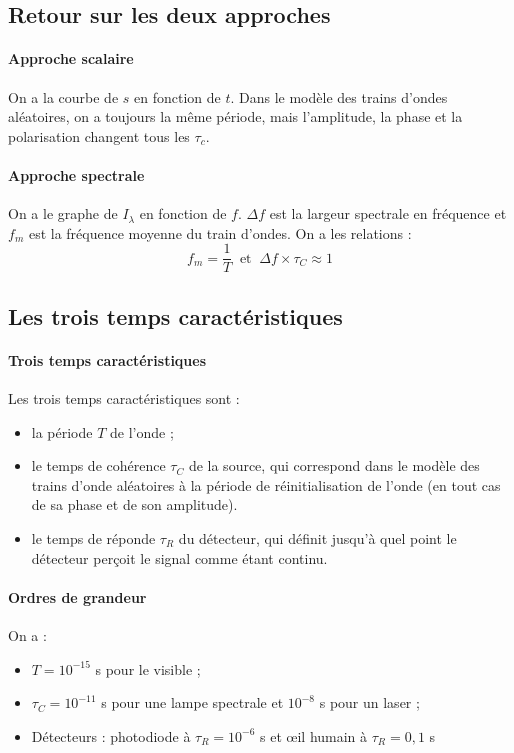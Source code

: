 \documentclass[french]{book}
\theoremstyle{plain}
\theoremstyle{definition}
\theoremstyle{remark}
\begin{document}
\subsection{Retour sur les deux approches}
\paragraph{Approche scalaire} On a la courbe de $s$ en fonction de $t$. Dans le modèle des trains d'ondes aléatoires, on a toujours la même période, mais l'amplitude, la phase et la polarisation changent tous les $\tau_c$.
\paragraph{Approche spectrale} On a le graphe de $I_\lambda$ en fonction de $f$. $\Delta f$ est la largeur spectrale en fréquence et $f_m$ est la fréquence moyenne du train d'ondes. On a les relations : $$f_m=\frac{1}{T} \ \text{ et } \ \Delta f\times\tau_C\approx 1$$
\subsection{Les trois temps caractéristiques}
\paragraph{Trois temps caractéristiques} Les trois temps caractéristiques sont : 
\begin{itemize}
	\item la période $T$ de l'onde ;
	\item le temps de cohérence $\tau_C$ de la source, qui correspond dans le modèle des trains d'onde aléatoires à la période de réinitialisation de l'onde (en tout cas de sa phase et de son amplitude).
	\item le temps de réponde $\tau_R$ du détecteur, qui définit jusqu'à quel point le détecteur perçoit le signal comme étant continu.
\end{itemize}
\paragraph{Ordres de grandeur} On a :
\begin{itemize}
	\item $T=10^{-15}$ s pour le visible ;
	\item $\tau_C=10^{-11}$ s pour une lampe spectrale et $10^{-8}$ s pour un laser ;
	\item Détecteurs : photodiode à $\tau_R=10^{-6}$ s et œil humain à $\tau_R=0,1$ s
\end{itemize}
\end{document}
